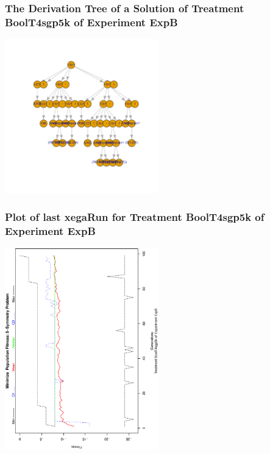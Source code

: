 \documentclass[18pt,c]{beamer}
\begin{document}
 \begin{frame}
 \frametitle{ The Derivation Tree of a Solution of Treatment BoolT4sgp5k of Experiment ExpB }
 \begin{center}
\includegraphics[width=0.5\textwidth, angle=0]
{ExpBDerivationTreeFigure023.pdf}
 \end{center}
 \label{report/ExpBDerivationTreeFigure023.pdf}  
 \end{frame}

 \begin{frame}
 \frametitle{ Plot of last xegaRun for Treatment BoolT4sgp5k of Experiment ExpB }
 \begin{center}
\includegraphics[width=0.5\textwidth, angle=-90]
{ExpBPlotPopStatsFigure023.eps}
 \end{center}
 \label{report/ExpBPlotPopStatsFigure023.eps}  
 \end{frame}
\end{document}
